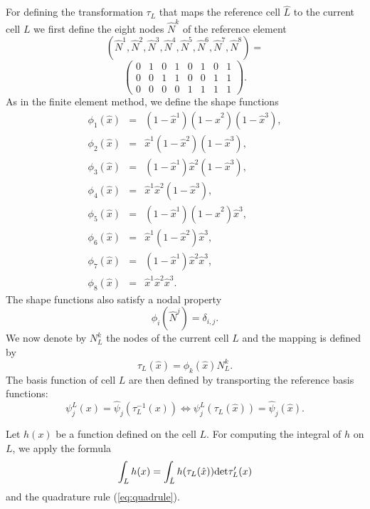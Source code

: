 \documentclass[12pt]{amsart}
\begin{document}
For defining the transformation $\tau_L$ that maps the reference cell $\hat L$ to the current cell $L$ we first define the eight nodes $\hat N^k$  of the reference element
$$(\hat{N}^{1},\hat{N}^{2},\hat{N}^{3},\hat{N}^{4},\hat{N}^{5},\hat{N}^{6},\hat{N}^{7},\hat{N}^{8})=$$
$$\left(\begin{array}{cccccccc}
0 & 1 & 0 & 1 & 0 & 1 & 0 & 1\\
0 & 0 & 1 & 1 & 0 & 0 & 1 & 1\\
0 & 0 & 0 & 0 & 1 & 1 & 1 & 1
\end{array}\right).
$$
As in the finite element method, we define the shape functions
\begin{eqnarray*}
\phi_{1}(\hat{x}) & = & (1-\hat{x}^{1})(1-\hat{x}^{2})(1-\hat{x}^{3}),\\
\phi_{2}(\hat{x}) & = & \hat{x}^{1}(1-\hat{x}^{2})(1-\hat{x}^{3}),\\
\phi_{3}(\hat{x}) & = & (1-\hat{x}^{1})\hat{x}^{2}(1-\hat{x}^{3}),\\
\phi_{4}(\hat{x}) & = & \hat{x}^{1}\hat{x}^{2}(1-\hat{x}^{3}),\\
\phi_{5}(\hat{x}) & = & (1-\hat{x}^{1})(1-\hat{x}^{2})\hat{x}^{3},\\
\phi_{6}(\hat{x}) & = & \hat{x}^{1}(1-\hat{x}^{2})\hat{x}^{3},\\
\phi_{7}(\hat{x}) & = & (1-\hat{x}^{1})\hat{x}^{2}\hat{x}^{3},\\
\phi_{8}(\hat{x}) & = & \hat{x}^{1}\hat{x}^{2}\hat{x}^{3}.
\end{eqnarray*}
The shape functions also satisfy a nodal property $$ \phi_i(\hat N^j)=\delta_{i,j}.$$ We now denote by $N_L^k$ the nodes of the current cell $L$ and the mapping is defined by
$$ \tau_L(\hat x)=\phi_k(\hat x)N_L^k .$$The basis function of cell $L$ are then defined by transporting the reference basis functions:
$$
\psi_j^L(x)=\hat \psi_j(\tau_L^{-1}(x)) \Leftrightarrow \psi_j^L(\tau_L(\hat x))=\hat \psi_j(\hat x).
$$


Let $h(x)$ be a function defined on the cell $L$. For computing the integral of $h$ on $L$, we apply the formula
$$
\int_L h(x) = \int_{\hat L} h(\tau_L(\hat x)) \hbox{det} \tau'_L(x)
$$
and the quadrature rule (\ref{eq:quadrule}).
\end{document}
